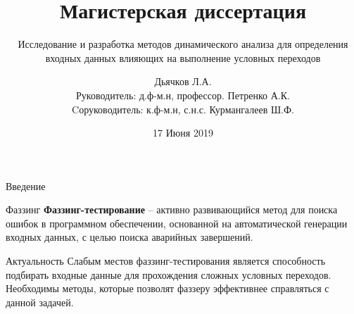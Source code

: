 \documentclass[10pt]{beamer}
\title{Магистерская диссертация}
\subtitle{Исследование и разработка методов динамического анализа для определения входных данных влияющих на выполнение условных переходов}
\author{Дьячков Л.А.\\[3mm]{\small Руководитель: д.ф-м.н, профессор. Петренко А.К.}\\[1mm]
{\small Cоруководитель: к.ф-м.н, с.н.с. Курмангалеев Ш.Ф.}\\[3mm]
}
\institute{ИСП РАН}
\date{17 Июня 2019}
\begin{document}
\maketitle



\begin{frame}{Введение}
  \begin{block}{Фаззинг}
  \textbf{Фаззинг-тестирование} -- активно развивающийся метод для поиска ошибок в программном обеспечении, основанной на автоматической генерации входных данных, с целью поиска аварийных завершений.
  \end{block}

  \begin{block}{Актуальность}
  Слабым местов фаззинг-тестирования является способность подбирать входные данные для прохождения сложных условных переходов. Необходимы методы, которые позволят фаззеру эффективнее справляться с данной задачей.

  \end{block}
\end{frame}
\end{document}
